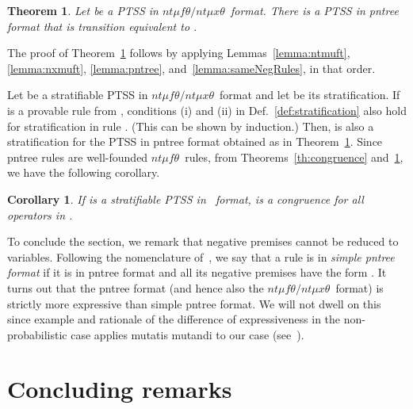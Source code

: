 \documentclass[submission,copyright,creativecommons]{eptcs}
\newtheorem{theorem}{Theorem}
\newtheorem{corollary}{Corollary}
\newcommand{\ntmuft}{\ensuremath{\textit{nt}\mu\textit{f}\theta}}
\newcommand{\ntmuxt}{\ensuremath{\textit{nt}\mu\textit{x}\theta}}
\newcommand{\ntmufxt}{\ensuremath{\ntmuft\textit{/}\ntmuxt}}
\newcommand{\colorpar}[3]{\colorbox{#1}{\parbox{#2}{#3}}}
\newcommand{\marginremark}[3]{\marginpar{\colorpar{#2}{\linewidth}{\color{#1}#3}}}
\newcommand{\remarkDG}[1]{\marginremark{darkgreen}{lightyellow}{\tiny{[DG]~ #1}}}
\renewcommand{\remarkDG}[1]{}
\begin{document}
\begin{theorem}\label{th:ntumufxtPNTree}
 Let  be a PTSS in \ntmufxt\ format. There is a 
 PTSS  in pntree format that is transition equivalent to .
\end{theorem}

The proof of Theorem~\ref{th:ntumufxtPNTree} follows by applying
Lemmas~\ref{lemma:ntmuft}, \ref{lemma:nxmuft}, \ref{lemma:pntree},
and~\ref{lemma:sameNegRules}, in that order.

Let  be a stratifiable PTSS in \ntmufxt\ format and let  be its
stratification.
If  is a provable rule from , conditions (i) and (ii) in
Def.~\ref{def:stratification} also hold for stratification  in rule
.  (This can be shown by induction.)
Then,  is also a stratification for the PTSS  in pntree format
obtained as in Theorem~\ref{th:ntumufxtPNTree}.
Since pntree rules are well-founded \ntmuft\ rules, from
Theorems~\ref{th:congruence} and~\ref{th:ntumufxtPNTree}, we have the
following corollary.

\begin{corollary}  
 If  is a stratifiable PTSS in \ format,  is a congruence for all operators in .
\end{corollary}
\remarkDG{Even if it is a straight forward conclusion from the earlier propositions should we really just use corollary for this main theorem/main result of the paper (beside the technical machinery developed)? Maybe some of the earlier theorems should become only propositions?}

To conclude the section, we remark that negative premises cannot be
reduced to variables.
Following the nomenclature of~\cite{FokkinkvanGlabbeek96}, we say that
a rule is in \emph{simple pntree format} if it is in pntree format and
all its negative premises have the form .
It turns out that the pntree format (and hence also the
\ntmufxt\ format) is strictly more expressive than simple pntree
format.
We will not dwell on this since example and rationale of the
difference of expressiveness in the non-probabilistic case applies
mutatis mutandi to our case (see~\cite{FokkinkvanGlabbeek96}).




\section{Concluding remarks}
\end{document}
